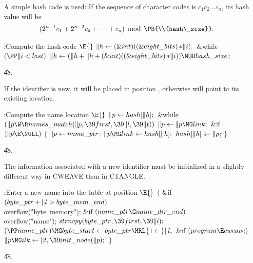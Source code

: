 A simple hash code is used: If the sequence of
character codes is $c_1c_2\ldots c_n$, its hash value will be
$$(2^{n-1}c_1+2^{n-2}c_2+\cdots+c_n)\,\bmod\,\PB{\\{hash\_size}}.$$

\Y\B\4:Compute the hash code \X${}\E{}$\6
$\|h\leftarrow(\&{int})((\&{eight\_bits})\,{*}\|i);{}$\6
\&{while} ${}(\PP\|i<\\{last}){}$\1\5
${}\|h\K(\|h+\|h+(\&{int})((\&{eight\_bits})\,{*}\|i))\MOD\\{hash\_size}{}$;\2%
\par
\U48.\fi

If the identifier is new, it will be placed in position ,
otherwise  will point to its existing location.

\Y\B\4:Compute the name location \X${}\E{}$\6
$\|p\leftarrow\\{hash}[\|h];{}$\6
\&{while} ${}(\|p\W\R\\{names\_match}(\|p,\39\\{first},\39\|l,\39\|t)){}$\1\5
${}\|p\K\|p\MG\\{link};{}$\2\6
\&{if} ${}(\|p\E\NULL){}$\5
${}\{{}$\1\6
${}\|p\leftarrow\\{name\_ptr}{}$;\6
${}\|p\MG\\{link}\K\\{hash}[\|h];{}$\6
${}\\{hash}[\|h]\leftarrow\|p{}$;\6
\4${}\}{}$\2\par
\U48.\fi

The information associated with a new identifier must be initialized
in a slightly different way in \.{CWEAVE} than in \.{CTANGLE}.

\Y\B\4:Enter a new name into the table at position \X${}\E{}$\6
${}\{{}$\1\6
\&{if} ${}(\\{byte\_ptr}+\|l>\\{byte\_mem\_end}){}$\1\5
\\{overflow}(\.{"byte\ memory"});\2\6
\&{if} ${}(\\{name\_ptr}\G\\{name\_dir\_end}){}$\1\5
\\{overflow}(\.{"name"});\2\6
${}\\{strncpy}(\\{byte\_ptr},\39\\{first},\39\|l);{}$\6
${}(\PP\\{name\_ptr})\MG\\{byte\_start}\K\\{byte\_ptr}\MRL{+{\K}}\|l;{}$\6
\&{if} ${}(\\{program}\E\\{cweave}){}$\1\5
${}\|p\MG\\{ilk}\K\|t,\39\\{init\_node}(\|p);{}$\2\6
\4${}\}{}$\2\par
\U48.\fi

